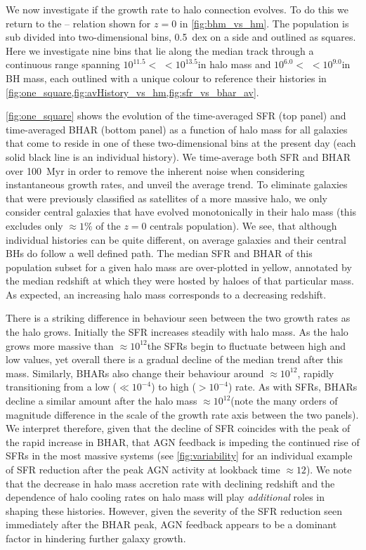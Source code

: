 We now investigate if the growth rate to halo connection evolves.  To do this
we return to the -- relation shown for $z=0$ in
\cref{fig:bhm_vs_hm}. The population is sub divided into two-dimensional bins,
0.5~dex on a side and outlined as squares.  Here we investigate nine bins that
lie along the median track through a continuous range spanning $10^{11.5} <$
 $< 10^{13.5}$\Msol in halo mass and $10^{6.0} <$  $<
10^{9.0}$\Msol in BH mass, each outlined with a unique colour to reference
their histories in
\cref{fig:one_square,fig:avHistory_vs_hm,fig:sfr_vs_bhar_av}.

\cref{fig:one_square} shows the evolution of the time-averaged SFR (top panel)
and time-averaged BHAR (bottom panel) as a function of halo mass for all
galaxies that come to reside in one of these two-dimensional bins at the
present day (each solid black line is an individual history). We time-average
both SFR and BHAR over 100~Myr in order to remove the inherent noise when
considering instantaneous growth rates, and unveil the average trend.  To
eliminate galaxies that were previously classified as satellites of a more
massive halo, we only consider central galaxies that have evolved monotonically
in their halo mass (this excludes only $\approx 1\%$ of the $z=0$ centrals
population).  We see, that although individual histories can be quite
different, on average galaxies and their central BHs do follow a well defined
path.  The median SFR and BHAR of this population subset for a given halo mass
are over-plotted in yellow, annotated by the median redshift at which they were
hosted by haloes of that particular mass.  As expected, an increasing halo mass
corresponds to a decreasing redshift.

There is a striking difference in behaviour seen between the two growth rates
as the halo grows.  Initially the SFR increases steadily with halo mass. As the
halo grows more massive than $\approx 10^{12}$\Msol the SFRs begin to fluctuate
between high and low values, yet overall there is a gradual decline of the
median trend after this mass.  Similarly, BHARs also change their behaviour
around $\approx 10^{12}$\Msol, rapidly transitioning from a low (\BHAR $\ll
10^{-4}$\Msolyr) to high (\BHAR $> 10^{-4}$\Msolyr) rate. As with SFRs, BHARs
decline a similar amount after the halo mass $\approx 10^{12}$\Msol (note the
many orders of magnitude difference in the scale of the growth rate axis
between the two panels).  We interpret therefore, given that the decline of SFR
coincides with the peak of the rapid increase in BHAR, that AGN feedback is
impeding the continued rise of SFRs in the most massive systems (see
\cref{fig:variability} for an individual example of SFR reduction after the
peak AGN activity at lookback time $\approx 12$).  We note that the decrease in
halo mass accretion rate with declining redshift and the dependence of halo
cooling rates on halo mass will play \textit{additional} roles in shaping these
histories. However, given the severity of the SFR reduction seen immediately
after the BHAR peak, AGN feedback appears to be a dominant factor in hindering
further galaxy growth.

